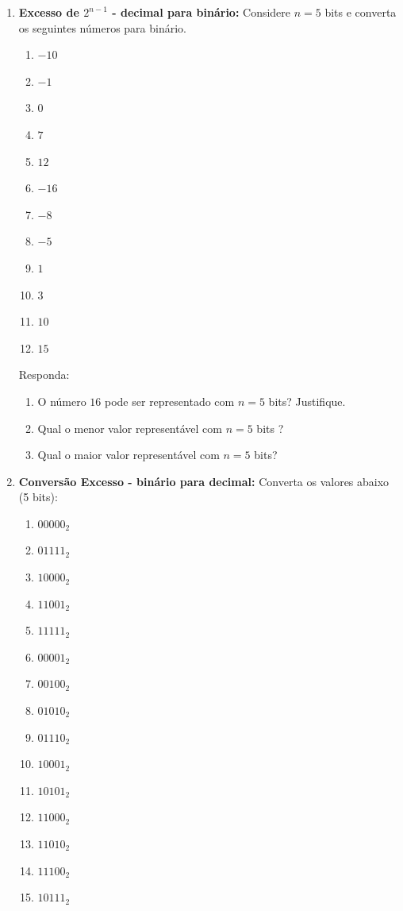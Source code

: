 \begin{enumerate}
    \item \textbf{Excesso de $2^{n-1}$   - decimal para binário:}
          Considere $n = 5$ bits e converta os seguintes números para binário.

          \begin{enumerate}
              \item  $-10$
              \item $-1$
              \item $0$
              \item $7$
              \item $12$
              \item  $-16$
              \item  $-8$
              \item  $-5$
              \item  $1$
              \item  $3$
              \item  $10$
              \item  $15$
          \end{enumerate}

          Responda:
          \begin{enumerate}
              \item O número $16$ pode ser representado com $n = 5$ bits? Justifique.
              \item Qual o menor valor representável com $n = 5$ bits ?
              \item Qual o maior valor representável com $n = 5$ bits?
          \end{enumerate}
    \item \textbf{Conversão Excesso - binário para decimal:}
          Converta os valores abaixo (5 bits):

          \begin{enumerate}
              \item $00000_2$
              \item $01111_2$
              \item $10000_2$
              \item $11001_2$
              \item $11111_2$
              \item $00001_2$
              \item $00100_2$
              \item $01010_2$
              \item $01110_2$
              \item $10001_2$
              \item $10101_2$
              \item $11000_2$
              \item $11010_2$
              \item $11100_2$
              \item $10111_2$
          \end{enumerate}


\end{enumerate}
